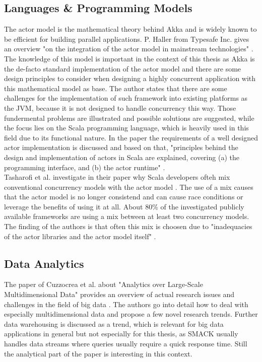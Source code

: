 \subsection{Languages \& Programming Models}
The actor model is the mathematical theory behind Akka and is widely known to be efficient for building parallel applications.
P. Haller from Typesafe Inc. gives an overview "on the integration of the actor model in mainstream technologies" \cite{haller2012integration}.
The knowledge of this model is important in the context of this thesis as Akka is the de-facto standard implementation of the actor model and there are some design principles to consider when designing a highly concurrent application with this mathematical model as base.
The author states that there are some challenges for the implementation of such framework into existing platforms as the JVM, because it is not designed to handle concurrency this way.
Those fundermental problems are illustrated and possible solutions are suggested, while the focus lies on the Scala programming language, which is heavily used in this field due to its functional nature.
In the paper the requirements of a well designed actor implementation is discussed and based on that, "principles behind the design and implementation of actors in Scala are explained, covering (a) the programming interface, and (b) the actor runtime" \cite{haller2012integration}.\\
Tasharofi et al. investigate in their paper why Scala developers ofteh mix conventional concurrency models with the actor model \cite{tasharofi2013scala}.
The use of a mix causes that the actor model is no longer consistend and can cause race conditions or leverage the benefits of using it at all.
About 80\% of the investigated publicly available frameworks are using a mix between at least two concurrency models.
The finding of the authors is that often this mix is choosen due to "inadequacies of the actor libraries and the actor model itself" \cite{tasharofi2013scala}.\\


\subsection{Data Analytics}
The paper of Cuzzocrea et al. about "Analytics over Large-Scale Multidimensional Data" provides an overview of actual research issues and challenges in the field of big data \cite{cuzzocrea2011analytics}.
The authors go into detail how to deal with especially multidimensional data and propose a few novel research trends.
Further data warehousing is discussed as a trend, which is relevant for big data applications in general but not especially for this thesis, as SMACK usually handles data streams where queries usually require a quick response time.
Still the analytical part of the paper is interesting in this context.\\

